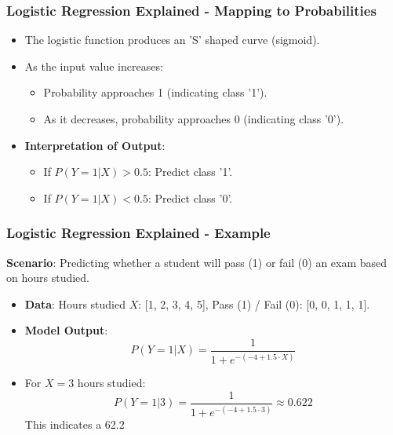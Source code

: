 \documentclass[aspectratio=169]{beamer}
\begin{document}
\begin{frame}[fragile]
    \frametitle{Logistic Regression Explained - Mapping to Probabilities}
    \begin{itemize}
        \item The logistic function produces an 'S' shaped curve (sigmoid).
        \item As the input value increases:
        \begin{itemize}
            \item Probability approaches 1 (indicating class '1').
            \item As it decreases, probability approaches 0 (indicating class '0').
        \end{itemize}
        \item \textbf{Interpretation of Output}:
        \begin{itemize}
            \item If \( P(Y=1|X) > 0.5 \): Predict class '1'.
            \item If \( P(Y=1|X) < 0.5 \): Predict class '0'.
        \end{itemize}
    \end{itemize}
\end{frame}

\begin{frame}[fragile]
    \frametitle{Logistic Regression Explained - Example}
    \textbf{Scenario}: Predicting whether a student will pass (1) or fail (0) an exam based on hours studied.

    \begin{itemize}
        \item \textbf{Data}: Hours studied \( X \): [1, 2, 3, 4, 5], Pass (1) / Fail (0): [0, 0, 1, 1, 1].
        \item \textbf{Model Output}:
        \begin{equation}
            P(Y=1|X) = \frac{1}{1 + e^{-(-4 + 1.5 \cdot X)}}
        \end{equation}
        \item For \( X = 3 \) hours studied:
        \begin{equation}
            P(Y=1|3) = \frac{1}{1 + e^{-(-4 + 1.5 \cdot 3)}} \approx 0.622
        \end{equation}
        This indicates a 62.2%
    \end{itemize}
\end{frame}
\end{document}

